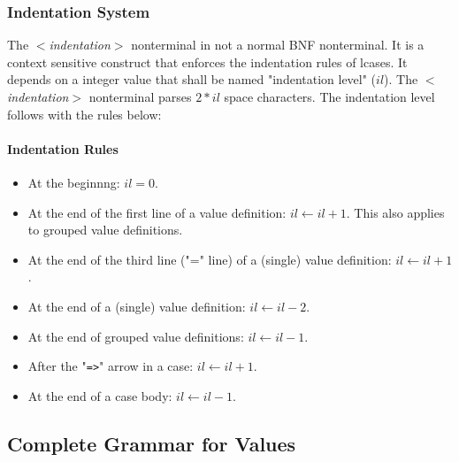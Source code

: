 \documentclass{article}
\begin{document}
\subsubsection{Indentation System}
\label{subsubsec:indsys}

The \textit{$<$indentation$>$} nonterminal in not a normal BNF nonterminal. It is a
context sensitive construct that enforces the indentation rules of lcases.
It depends on a integer value that shall be named "indentation level" ($il$).
The \textit{$<$indentation$>$} nonterminal parses $2*il$ space characters.
The indentation level follows with the rules below:

\paragraph{Indentation Rules}
\begin{itemize}

\item
At the beginnng: $il = 0$.

\item
At the end of the first line of a value definition: $il \leftarrow il + 1$.
This also applies to grouped value definitions.

\item
At the end of the third line ("=" line) of a (single) value definition: $il
\leftarrow il + 1$.

\item
At the end of a (single) value definition: $il \leftarrow il - 2$.

\item
At the end of grouped value definitions: $il \leftarrow il - 1$.

\item
After the "\texttt{=>}" arrow in a case: $il \leftarrow il + 1$.

\item
At the end of a case body: $il \leftarrow il - 1$.

\end{itemize}

\subsection{Complete Grammar for Values}
\end{document}
